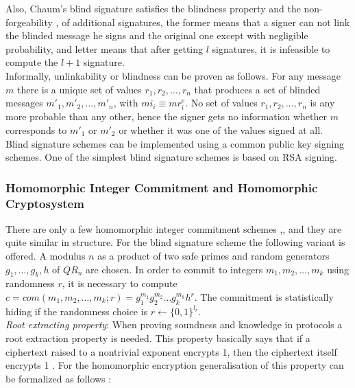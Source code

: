 Also, Chaum's blind signature satisfies the blindness property \cite{Chaum1982} and the non-forgeability \cite{Pointcheval1996},\cite{Abstract1997} of additional signatures, the former means that a signer can not  link the blinded message he signs and the original one except with negligible probability, and letter means that after getting $l$ signatures, it is infeasible to compute the $l+1$ signature.\\

Informally, unlinkability or blindness can be proven as follows. For any message $m$  there is a unique set of values $r_1,r_2,\dots,r_n$ that produces a set of blinded messages $m'_1,m'_2,\dots,m'_n$, with $mi_i  \equiv mr_i^e$. No set of values $r_1,r_2,\dots,r_n$ is any more probable than any other, hence the signer gets no information whether $m$ corresponds to $m'_1$ or $m'_2$ or whether it was one of the values signed at all.\\

Blind signature schemes can be implemented using a common public key signing schemes. One of the simplest blind signature schemes is based on RSA signing. \subsubsection{Homomorphic Integer Commitment and Homomorphic Cryptosystem}
There are only a few homomorphic integer commitment schemes \cite{Eiichiro1997},\cite{Damg},\cite{Groth2005a} and they are quite similar in structure. For the blind signature scheme  the following variant is offered.  A modulus $n$ as a product of two safe primes and random generators $g_1, \dots, g_k,h$ of $QR_n$ are chosen. In order to commit to integers $m_1,m_2, \dots, m_k$ using randomness $r$, it is necessary to compute $c = com( m_1,m_2, \dots, m_k; r) = g_1^{m_1}g_2^{m_2}\dots g_k^{m_k}h^r$. The commitment is statistically hiding if the randomness choice is $r \leftarrow \{0,1\}^{l_r}$.\\

\textit{Root extracting property}: When proving soundness and knowledge in protocols a root extraction property is needed. This property basically says that if a ciphertext raised to a nontrivial exponent encrypts 1, then the ciphertext itself encrypts 1 \cite{Groth2010}. For the homomorphic encryption generalisation of this property can be formalized as follows \cite{Groth2005}: \\

\\


